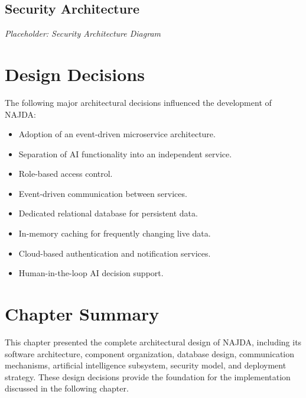\subsection{Security Architecture}

\textit{Placeholder: Security Architecture Diagram}


\section{Design Decisions}

The following major architectural decisions influenced the development of NAJDA:

\begin{itemize}
    \item Adoption of an event-driven microservice architecture.
    \item Separation of AI functionality into an independent service.
    \item Role-based access control.
    \item Event-driven communication between services.
    \item Dedicated relational database for persistent data.
    \item In-memory caching for frequently changing live data.
    \item Cloud-based authentication and notification services.
    \item Human-in-the-loop AI decision support.
\end{itemize}


\section{Chapter Summary}

This chapter presented the complete architectural design of NAJDA, including its software architecture, component organization, database design, communication mechanisms, artificial intelligence subsystem, security model, and deployment strategy. These design decisions provide the foundation for the implementation discussed in the following chapter.